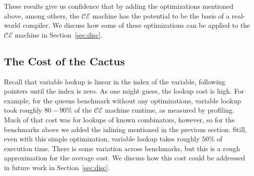These results give us confidence that by adding the optimizations mentioned
above, among others, the $\mathcal{CE}$ machine has the potential to be the
basis of a real-world compiler. We discuss how some of these optimizations can
be applied to the $\mathcal{CE}$ machine in Section~\ref{sec:disc}.

\subsection{The Cost of the Cactus}

Recall that variable lookup is linear in the index of the variable, following
pointers until the index is zero. As one might guess, the lookup cost is high.
For example, for the queens benchmark without any optimizations, variable lookup
took roughly $80-90\%$ of the $\mathcal{CE}$ machine runtime, as measured
by profiling. Much of that cost was for lookups of known combinators, however,
so for the benchmarks above we added the inlining mentioned in the previous
section. Still, even with this simple optimization, variable lookup takes
roughly $50\%$ of execution time. There is some variation across benchmarks, but
this is a rough approximation for the average cost. We discuss how this cost
could be addressed in future work in Section~\ref{sec:disc}.


